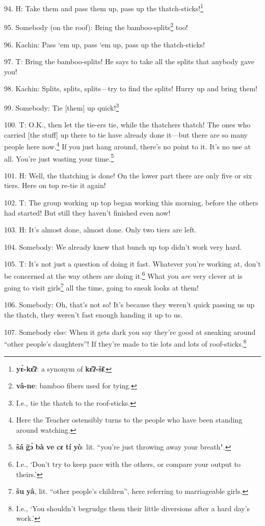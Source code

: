 94. H: Take them and pass them up, pass up the thatch-sticks!\footnote{\textbf{yɛ̀-kɛ̂ʔ}: a synonym of \textbf{kɛ̂ʔ-šɨ̄}.}

95. Somebody (on the roof): Bring the bamboo-splits\footnote{\textbf{vâ-ne}: bamboo fibers used for tying.} too!

96. Kachin: Pass `em up, pass `em up, pass up the thatch-sticks!

97. T: Bring the bamboo-splits! He says to take all the splits that anybody gave
you!

98. Kachin: Splits, splits, splits---try to find the splits! Hurry up and bring
them!

99. Somebody: Tie [them] up quick!\footnote{I.e., tie the thatch to the roof-sticks.}

100. T: O.K., then let the tie-ers tie, while the thatchers thatch! The ones who
carried [the stuff] up there to tie have already done it---but there are so many
people here now.\footnote{Here the Teacher ostensibly turns to the people who have been standing around watching.} If you just hang around, there's no point to it. It's no
use at all. You're just wasting your time.\footnote{\textbf{šá} \textbf{g̈ɔ̀} \textbf{bà} \textbf{ve} \textbf{cɛ} \textbf{tí} \textbf{yò}: lit. ``you're just throwing away your breath".}

101. H: Well, the thatching is done! On the lower part there are only five or
six tiers. Here on top re-tie it again!

102. T: The group working up top began working this morning, before the others
had started! But still they haven't finished even now!

103. H: It's almost done, almost done. Only two tiers are left.

104. Somebody: We already knew that bunch up top didn't work very hard.

105. T: It's not just a question of doing it fast. Whatever you're working at,
don't be concerned at the way others are doing it.\footnote{I.e., `Don't try to keep pace with the others, or compare your output to theirs.'} What you \textit{are}
very clever at is going to visit girls\footnote{\textbf{šu} \textbf{yâ}, lit. ``other people's children'', here referring to marriageable girls.} all the time, going to sneak looks
at them!

106. Somebody: Oh, that's not so! It's because they weren't quick passing us up
the thatch, they weren't fast enough handing it up to us.

107. Somebody else: When it gets dark you say they're good at sneaking around ``other
people's daughters''! If they're made to tie lots and lots of roof-sticks.\footnote{I.e., `You shouldn't begrudge them their little diversions after a hard day's work.'}

